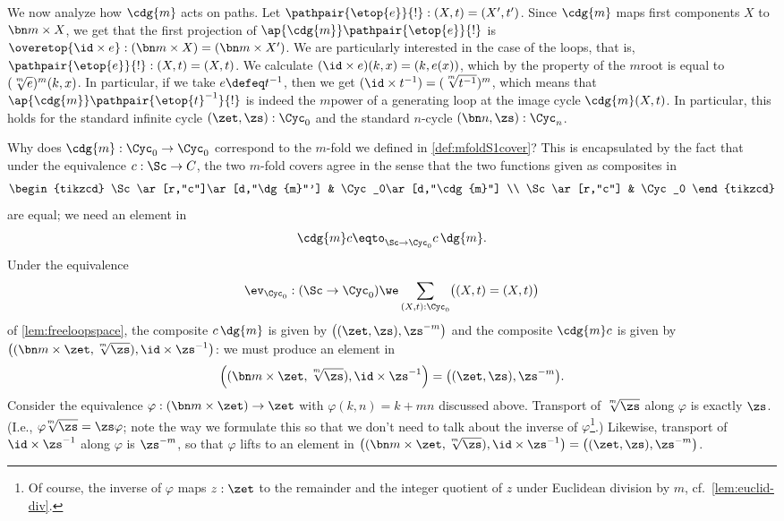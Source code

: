 We now analyze how $\cdg{m}$ acts on paths.
Let $\pathpair{\etop{e}}{!}:(X,t)=(X',t')$.
Since $\cdg{m}$ maps first components $X$ to $\bn m\times X$, we get that
the first projection of $\ap{\cdg{m}}\pathpair{\etop{e}}{!}$ is
$\overetop{\id\times e} : (\bn m\times X) = (\bn m\times X')$.
We are particularly interested in the case of the loops,
that is, $\pathpair{\etop{e}}{!}:(X,t)=(X,t)$.
We calculate $(\id\times e)(k,x) = (k,e(x))$,
which by the property of the $m$\th root is equal to $(\sqrt[\uproot{2}m]e)^m(k,x)$.
In particular, if we take $e\defeq t^{-1}$,
then we get $(\id\times t^{-1}) = (\sqrt[\uproot{2}m]{t^{-1}})^m$, which means that
$\ap{\cdg{m}}\pathpair{\etop{t}^{-1}}{!}$ is indeed the $m$\th power of a
generating loop at the image cycle $\cdg{m}(X,t)$.
In particular, this holds for the standard infinite cycle $(\zet,\zs):\Cyc_0$
and the standard $n$-cycle $(\bn n,\zs):\Cyc_n$.

Why does $\cdg{m}:\Cyc_0\to\Cyc_0$
correspond to the $m$-fold \covering we defined in \cref{def:mfoldS1cover}?
This is encapsulated by the fact that under the equivalence $c:\Sc\to C$, the two $m$-fold covers agree in the sense that the two functions given as composites in
\[
  \begin{tikzcd}
    \Sc\ar[r,"c"]\ar[d,"\dg{m}"'] & \Cyc_0\ar[d,"\cdg{m}"] \\
    \Sc\ar[r,"c"] & \Cyc_0
  \end{tikzcd}
\]
are equal; we need an element in
\[
  \cdg{m}c\eqto_{\Sc\to\Cyc_0}c\,\dg{m}.
\]
Under the equivalence
\[
  \ev_{\Cyc_0}:(\Sc\to\Cyc_0)\we \sum_{(X,t):\Cyc_0}\bigl((X,t)=(X,t)\bigr)
\]
of \cref{lem:freeloopspace},
the composite $c\,\dg{m}$ is given by $\bigl((\zet,\zs),\zs^{-m}\bigr)$
and the composite $\cdg{m}c$ is given by
$\bigl((\bn m\times\zet,\sqrt[\uproot{2}m]{\zs}),\id\times\zs^{-1}\bigr)$:
we must produce an element in
\[
  \Bigl((\bn m\times\zet,\sqrt[\uproot{2}m]{\zs}),\id\times\zs^{-1}\Bigr)
  = \bigl((\zet,\zs),\zs^{-m}\bigr).
\]
Consider the equivalence  $\varphi: (\bn m\times \zet)\to\zet$ with $\varphi(k,n)=k+mn$ discussed above.
Transport of $\sqrt[\uproot{2}m]\zs$ along $\varphi$ is exactly $\zs$.
(I.e., $\varphi\!\sqrt[\uproot{2}m]\zs=\zs\varphi$;
note the way we formulate this so that we don't need to talk about the inverse of $\varphi$\footnote{%
  Of course, the inverse of $\varphi$ maps $z:\zet$ to the remainder and the integer quotient of $z$ under Euclidean division by $m$, cf.~\cref{lem:euclid-div}.}.)
Likewise, transport of $\id\times\zs^{-1}$ along $\varphi$ is $\zs^{-m}$,
so that $\varphi$ lifts to an element in
$\bigl((\bn m\times\zet,\sqrt[\uproot{2}m]{\zs}), \id\times\zs^{-1}\bigr)
= \bigl((\zet,\zs),\zs^{-m}\bigr)$.

